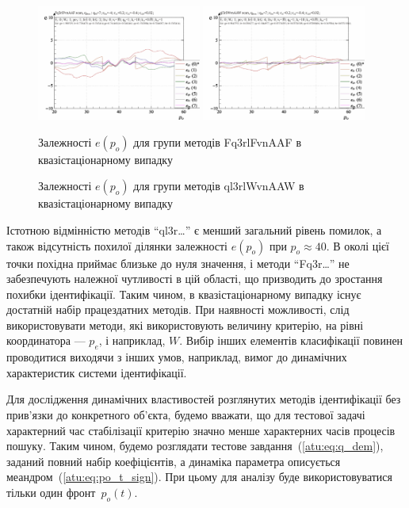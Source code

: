 \documentclass[a4paper,13pt]{atuaref}
\begin{document}
\begin{figure}[htb!]
    \includegraphics[width=0.48\textwidth]{p3/p/scan/qls-p_p_e_Fq3rlFvnAAF_scan.png} \hfill
    \includegraphics[width=0.48\textwidth]{p3/p/scan/qls-p_p_e_ql3rlWvnAAW_scan.png}
  \\
  \parbox[t]{0.48\textwidth} {
    \caption{Залежності $ e (p_o) $ для групи методів Fq3rlFvnAAF в квазістаціонарному випадку}
    \label{atu:f:Fq3rlFvnAAF_scan}
  } \hfill
  \parbox[t]{0.48\textwidth} {
    \caption{Залежності $ e (p_o) $ для групи методів ql3rlWvnAAW в квазістаціонарному випадку}
    \label{atu:f:ql3rlWvnAAW_scan}
  }
\end{figure}

Істотною відмінністю методів ``ql3r\ldots'' є менший загальний рівень
помилок, а також відсутність похилої ділянки залежності $ e (p_o) $ при
$ p_o \approx 40 $. В околі цієї точки похідна приймає близьке до нуля значення, і
методи ``Fq3r\ldots'' не забезпечують належної чутливості в цій області, що
призводить до зростання похибки ідентифікації.
Таким чином, в квазістаціонарному випадку існує достатній набір працездатних
методів. При наявності можливості, слід використовувати методи, які
використовують величину критерію, на рівні координатора --- $ p_e $, і
наприклад, $ W $. Вибір інших елементів класифікації повинен проводитися
виходячи з інших умов, наприклад, вимог до динамічних характеристик системи
ідентифікації.

Для дослідження динамічних властивостей розглянутих методів ідентифікації без
прив'язки до конкретного об'єкта, будемо вважати, що для тестової задачі
характерний час стабілізації критерію значно менше характерних часів процесів
пошуку.
Таким чином, будемо розглядати тестове завдання~(\ref{atu:eq:q_dem}),
заданий повний набір коефіцієнтів, а динаміка параметра описується меандром~(\ref{atu:eq:po_t_sign}).
При цьому для аналізу буде використовуватися тільки один фронт~$p_o(t)$.
\end{document}
